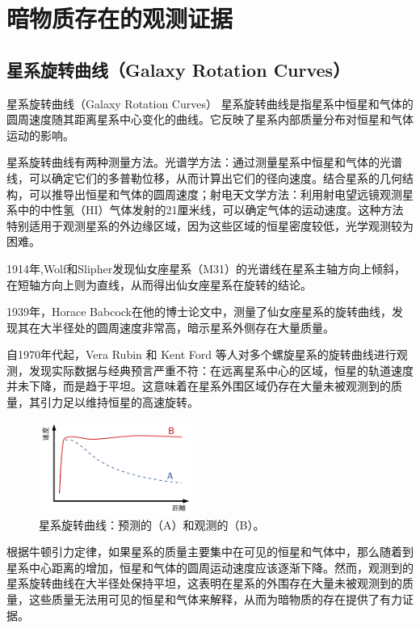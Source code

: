 \documentclass{beamer} %
\begin{document}
\section{暗物质存在的观测证据}

\subsection{星系旋转曲线（Galaxy Rotation Curves）}

\begin{frame}{星系旋转曲线（Galaxy Rotation Curves）}
星系旋转曲线是指星系中恒星和气体的圆周速度随其距离星系中心变化的曲线。它反映了星系内部质量分布对恒星和气体运动的影响。

星系旋转曲线有两种测量方法。光谱学方法：通过测量星系中恒星和气体的光谱线，可以确定它们的多普勒位移，从而计算出它们的径向速度。结合星系的几何结构，可以推导出恒星和气体的圆周速度；射电天文学方法：利用射电望远镜观测星系中的中性氢（HI）气体发射的21厘米线，可以确定气体的运动速度。这种方法特别适用于观测星系的外边缘区域，因为这些区域的恒星密度较低，光学观测较为困难。
\end{frame}

\begin{frame}
1914年,Wolf和Slipher发现仙女座星系（M31）的光谱线在星系主轴方向上倾斜，在短轴方向上则为直线，从而得出仙女座星系在旋转的结论。

1939年，Horace Babcock在他的博士论文中，测量了仙女座星系的旋转曲线，发现其在大半径处的圆周速度非常高，暗示星系外侧存在大量质量。

自1970年代起，Vera Rubin 和 Kent Ford 等人对多个螺旋星系的旋转曲线进行观测，发现实际数据与经典预言严重不符：在远离星系中心的区域，恒星的轨道速度并未下降，而是趋于平坦。这意味着在星系外围区域仍存在大量未被观测到的质量，其引力足以维持恒星的高速旋转。
\end{frame}

\begin{frame}
\begin{figure}[!htbp]
    \centering    
    \includegraphics[height=3cm]{Img/2-1.png}
    \caption{星系旋转曲线：预测的（A）和观测的（B）。 }
    \label{2-1}
\end{figure}

根据牛顿引力定律，如果星系的质量主要集中在可见的恒星和气体中，那么随着到星系中心距离的增加，恒星和气体的圆周运动速度应该逐渐下降。然而，观测到的星系旋转曲线在大半径处保持平坦，这表明在星系的外围存在大量未被观测到的质量，这些质量无法用可见的恒星和气体来解释，从而为暗物质的存在提供了有力证据。
\end{frame}
\end{document}
